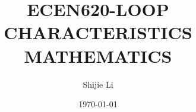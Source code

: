 \documentclass[a4paper,10pt]{article}
\begin{document}
\title{ECEN620-LOOP CHARACTERISTICS MATHEMATICS}
\author{Shijie Li}
\date{\today}
\maketitle


\end{document}
